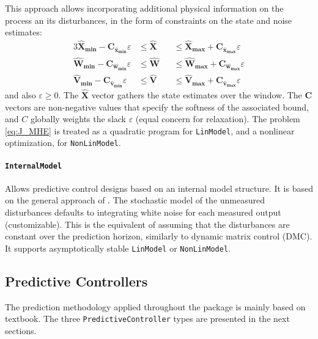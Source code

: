 This approach allows incorporating additional physical information on the process an its disturbances, in the form of constraints on the state and noise estimates:
\begin{alignat}{3}
    \mathbf{\hat{X}_{min} - C_{\hat{x}_{min}}} \varepsilon &\le \mathbf{\hat{X}} &&\le \mathbf{\hat{X}_{max} + C_{\hat{x}_{max}}} \varepsilon \\
    \mathbf{\hat{W}_{min} - C_{\hat{w}_{min}}} \varepsilon &\le \mathbf{\hat{W}} &&\le \mathbf{\hat{W}_{max} + C_{\hat{w}_{max}}} \varepsilon \\
    \mathbf{\hat{V}_{min} - C_{\hat{v}_{min}}} \varepsilon &\le \mathbf{\hat{V}} &&\le \mathbf{\hat{V}_{max} + C_{\hat{v}_{max}}} \varepsilon
\end{alignat}
and also $\varepsilon \ge 0$. The $\mathbf{\hat{X}}$ vector gathers the state estimates over the window. The $\mathbf{C}$ vectors are non-negative values that specify the softness of the associated bound, and $C$ globally weights the slack $\varepsilon$ (equal concern for relaxation). The problem \eqref{eq:J_MHE} is treated as a quadratic program for \texttt{LinModel}, and a nonlinear optimization, for \texttt{NonLinModel}.

\paragraph{\textnormal{\texttt{InternalModel}}}
Allows predictive control designs based on an internal model structure. It is based on the general approach of \citet{globPC}. The stochastic model of the unmeasured disturbances defaults to integrating white noise for each measured output (customizable). This is the equivalent of assuming that the disturbances are constant over the prediction horizon, similarly to dynamic matrix control (DMC). It supports asymptotically stable \texttt{LinModel} or \texttt{NonLinModel}.

\subsection{Predictive Controllers}

The prediction methodology applied throughout the package is mainly based on \citet{mpcMac} textbook. The three \texttt{PredictiveController} types are presented in the next sections.


